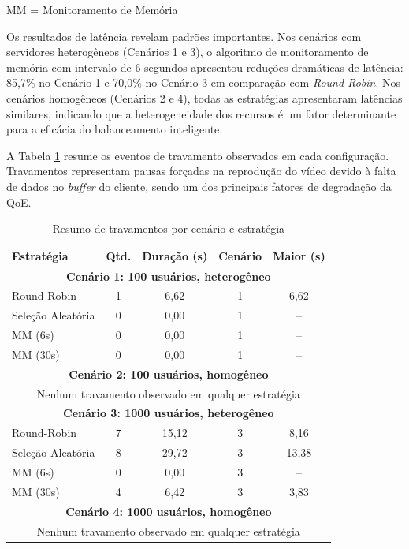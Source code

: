 \noindent\small{MM = Monitoramento de Memória}

Os resultados de latência revelam padrões importantes. Nos cenários com servidores heterogêneos (Cenários 1 e 3), o algoritmo de monitoramento de memória com intervalo de 6 segundos apresentou reduções dramáticas de latência: 85,7\% no Cenário 1 e 70,0\% no Cenário 3 em comparação com \textit{Round-Robin}. Nos cenários homogêneos (Cenários 2 e 4), todas as estratégias apresentaram latências similares, indicando que a heterogeneidade dos recursos é um fator determinante para a eficácia do balanceamento inteligente.

A Tabela \ref{tab:stalls-results} resume os eventos de travamento observados em cada configuração. Travamentos representam pausas forçadas na reprodução do vídeo devido à falta de dados no \textit{buffer} do cliente, sendo um dos principais fatores de degradação da QoE.

\begin{table}[htbp]
\centering
\caption{Resumo de travamentos por cenário e estratégia}
\label{tab:stalls-results}
\small
\begin{tabular}{|l|c|c|c|c|}
\hline
\textbf{Estratégia} & \textbf{Qtd.} & \textbf{Duração (s)} & \textbf{Cenário} & \textbf{Maior (s)} \\
\hline
\multicolumn{5}{|c|}{\textbf{Cenário 1: 100 usuários, heterogêneo}} \\
\hline
Round-Robin & 1 & 6,62 & 1 & 6,62 \\
Seleção Aleatória & 0 & 0,00 & 1 & -- \\
MM (6s) & 0 & 0,00 & 1 & -- \\
MM (30s) & 0 & 0,00 & 1 & -- \\
\hline
\multicolumn{5}{|c|}{\textbf{Cenário 2: 100 usuários, homogêneo}} \\
\hline
\multicolumn{5}{|c|}{Nenhum travamento observado em qualquer estratégia} \\
\hline
\multicolumn{5}{|c|}{\textbf{Cenário 3: 1000 usuários, heterogêneo}} \\
\hline
Round-Robin & 7 & 15,12 & 3 & 8,16 \\
Seleção Aleatória & 8 & 29,72 & 3 & 13,38 \\
MM (6s) & 0 & 0,00 & 3 & -- \\
MM (30s) & 4 & 6,42 & 3 & 3,83 \\
\hline
\multicolumn{5}{|c|}{\textbf{Cenário 4: 1000 usuários, homogêneo}} \\
\hline
\multicolumn{5}{|c|}{Nenhum travamento observado em qualquer estratégia} \\
\hline
\end{tabular}
\end{table}

